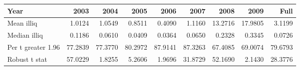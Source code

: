 \begin{tabular}{l|rrrrrrrr}
\toprule
Year & 2003 & 2004 & 2005 & 2006 & 2007 & 2008 & 2009 & Full \\
\midrule
Mean illiq & 1.0124 & 1.0549 & 0.8511 & 0.4090 & 1.1160 & 13.2716 & 17.9805 & 3.1199 \\
Median illiq & 0.1186 & 0.0610 & 0.0409 & 0.0364 & 0.0650 & 0.2328 & 0.3345 & 0.0726 \\
Per t greater 1.96 & 77.2839 & 77.3770 & 80.2972 & 87.9141 & 87.3263 & 67.4085 & 69.0074 & 79.6793 \\
Robust t stat & 57.0229 & 1.8255 & 5.2606 & 1.9696 & 31.8729 & 52.1690 & 2.1430 & 28.3776 \\
\bottomrule
\end{tabular}
